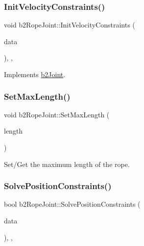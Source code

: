 \mbox{\label{classb2_rope_joint_a8a9bd57a12aaf38b529ae626e714e1e8}} 
\subsubsection{\texorpdfstring{InitVelocityConstraints()}{InitVelocityConstraints()}}
{\footnotesize\ttfamily void b2\+Rope\+Joint\+::\+Init\+Velocity\+Constraints (\begin{DoxyParamCaption}\item[{const \mbox{\hyperlink{structb2_solver_data}{b2\+Solver\+Data}} \&}]{data }\end{DoxyParamCaption})\hspace{0.3cm}{\ttfamily [override]}, {\ttfamily [protected]}, {\ttfamily [virtual]}}



Implements \mbox{\hyperlink{classb2_joint_a599c013de5514e02684b958b31dd76a4}{b2\+Joint}}.

\mbox{\label{classb2_rope_joint_a92cea201d21acd2f2a7cc9b00e165848}} 
\subsubsection{\texorpdfstring{SetMaxLength()}{SetMaxLength()}}
{\footnotesize\ttfamily void b2\+Rope\+Joint\+::\+Set\+Max\+Length (\begin{DoxyParamCaption}\item[{\mbox{\hyperlink{b2_settings_8h_aacdc525d6f7bddb3ae95d5c311bd06a1}{float32}}}]{length }\end{DoxyParamCaption})\hspace{0.3cm}{\ttfamily [inline]}}



Set/\+Get the maximum length of the rope. 

\mbox{\label{classb2_rope_joint_a2fcbda6d472c660aa01793c798a8f92e}} 
\subsubsection{\texorpdfstring{SolvePositionConstraints()}{SolvePositionConstraints()}}
{\footnotesize\ttfamily bool b2\+Rope\+Joint\+::\+Solve\+Position\+Constraints (\begin{DoxyParamCaption}\item[{const \mbox{\hyperlink{structb2_solver_data}{b2\+Solver\+Data}} \&}]{data }\end{DoxyParamCaption})\hspace{0.3cm}{\ttfamily [override]}, {\ttfamily [protected]}, {\ttfamily [virtual]}}



